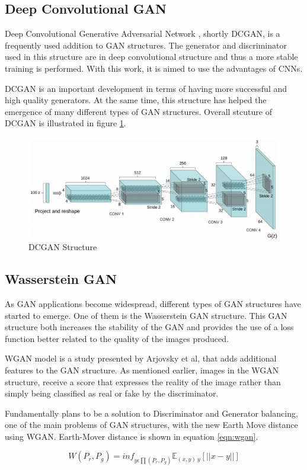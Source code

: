 \subsection{Deep Convolutional GAN}

Deep Convolutional Generative Adversarial Network \cite{dcgan}, shortly DCGAN, is a frequently used addition to GAN structures. The generator and discriminator used in this structure are in deep convolutional structure and thus a more stable training is performed. With this work, it is aimed to use the advantages of CNNs.

DCGAN is an important development in terms of having more successful and high quality generators. At the same time, this structure has helped the emergence of many different types of GAN structures. Overall stcuture of DCGAN is illustrated in figure \ref{fig:dcgan}.

\begin{figure}[h]
    \centering
    \includegraphics[scale=0.8]{figures/chapter3/dc-gan-structure.png}
    \caption{DCGAN Structure}
    \label{fig:dcgan}
\end{figure}

\subsection{Wasserstein GAN}

As GAN applications become widespread, different types of GAN structures have started to emerge. One of them is the Wasserstein GAN structure. This GAN structure both increases the stability of the GAN and provides the use of a loss function better related to the quality of the images produced.

WGAN model is a study presented by Arjovsky et al\cite{wgan}, that adds additional features to the GAN structure. As mentioned earlier, images in the WGAN structure, receive a score that expresses the reality of the image rather than simply being classified as real or fake by the discriminator.

Fundamentally plans to be a solution to Discriminator and Generator balancing, one of the main problems of GAN structures, with the new Earth Move distance using WGAN. Earth-Mover distance is shown in equation \ref{eqn:wgan}.

\begin{equation}
\label{eqn:wgan}
    W(P_r, P_g)= {inf}_{y\epsilon\prod (P_r,P_g)}\mathbb{E}_{(x,y)~y}[||x-y||]
\end{equation}
